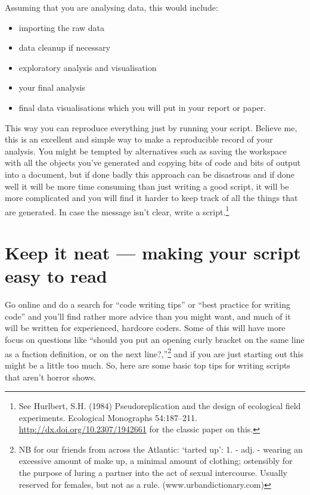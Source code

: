 \documentclass[
]{book}
\providecommand{\tightlist}{%
  \setlength{\itemsep}{0pt}\setlength{\parskip}{0pt}}
\begin{document}
Assuming that you are analysing data, this would include:

\begin{itemize}
\tightlist
\item
  importing the raw data
\item
  data cleanup if necessary
\item
  exploratory analysis and visualisation
\item
  your final analysis
\item
  final data visualisations which you will put in your report or paper.
\end{itemize}

This way you can reproduce everything just by running your script. Believe me, this is an excellent and simple way to make a reproducible record of your analysis. You might be tempted by alternatives such as saving the workspace with all the objects you've generated and copying bits of code and bits of output into a document, but if done badly this approach can be disastrous and if done well it will be more time consuming than just writing a good script, it will be more complicated and you will find it harder to keep track of all the things that are generated. In case the message isn't clear, write a script.\footnote{See Hurlbert, S.H. (1984) Pseudoreplication and the design of ecological field experiments. Ecological Monographs 54:187--211. \url{http://dx.doi.org/10.2307/1942661} for the classic paper on this.}

\hypertarget{keep-it-neat-making-your-script-easy-to-read}{%
\section{Keep it neat --- making your script easy to read}\label{keep-it-neat-making-your-script-easy-to-read}}

Go online and do a search for ``code writing tips'' or ``best practice for writing code'' and you'll find rather more advice than you might want, and much of it will be written for experienced, hardcore coders. Some of this will have more focus on questions like ``should you put an opening curly bracket on the same line as a fnction definition, or on the next line?,''\footnote{NB for our friends from across the Atlantic: `tarted up': 1. - adj. - wearing an excessive amount of make up, a minimal amount of clothing; ostensibly for the purpose of luring a partner into the act of sexual intercourse. Usually reserved for females, but not as a rule. (www.urbandictionary.com)} and if you are just starting out this might be a little too much. So, here are some basic top tips for writing scripts that aren't horror shows.
\end{document}
